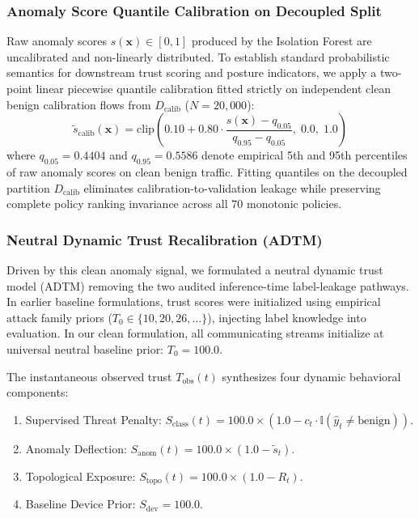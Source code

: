 \documentclass[journal,10pt,onecolumn]{IEEEtran}
\begin{document}
\subsubsection{Anomaly Score Quantile Calibration on Decoupled Split}
Raw anomaly scores $s(\mathbf{x}) \in [0, 1]$ produced by the Isolation Forest are uncalibrated and non-linearly distributed. To establish standard probabilistic semantics for downstream trust scoring and posture indicators, we apply a two-point linear piecewise quantile calibration fitted strictly on independent clean benign calibration flows from $D_{\text{calib}}$ ($N=20,000$):
$$\tilde{s}_{\text{calib}}(\mathbf{x}) = \text{clip}\left(0.10 + 0.80 \cdot \frac{s(\mathbf{x}) - q_{0.05}}{q_{0.95} - q_{0.05}}, \; 0.0, \; 1.0\right)$$
where $q_{0.05} = 0.4404$ and $q_{0.95} = 0.5586$ denote empirical 5th and 95th percentiles of raw anomaly scores on clean benign traffic. Fitting quantiles on the decoupled partition $D_{\text{calib}}$ eliminates calibration-to-validation leakage while preserving complete policy ranking invariance across all 70 monotonic policies.

\subsubsection{Neutral Dynamic Trust Recalibration (ADTM)}
Driven by this clean anomaly signal, we formulated a neutral dynamic trust model (ADTM) removing the two audited inference-time label-leakage pathways. In earlier baseline formulations, trust scores were initialized using empirical attack family priors ($T_0 \in \{10, 20, 26, \dots\}$), injecting label knowledge into evaluation. In our clean formulation, all communicating streams initialize at universal neutral baseline prior: $T_0 = 100.0$.

The instantaneous observed trust $T_{\text{obs}}(t)$ synthesizes four dynamic behavioral components:
\begin{enumerate}
    \item Supervised Threat Penalty: $S_{\text{class}}(t) = 100.0 \times (1.0 - c_t \cdot \mathbb{I}(\hat{y}_t \ne \text{benign}))$.
    \item Anomaly Deflection: $S_{\text{anom}}(t) = 100.0 \times (1.0 - \tilde{s}_t)$.
    \item Topological Exposure: $S_{\text{topo}}(t) = 100.0 \times (1.0 - R_t)$.
    \item Baseline Device Prior: $S_{\text{dev}} = 100.0$.
\end{enumerate}
\end{document}
